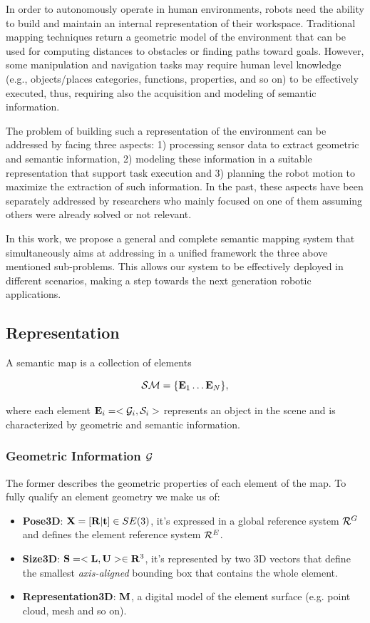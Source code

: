 \documentclass[conference]{IEEEtran}
\begin{document}
In order to autonomously operate in human environments, robots need
the ability to build and maintain an internal representation of their
workspace. Traditional mapping techniques return a geometric model of
the environment that can be used for computing distances to obstacles
or finding paths toward goals. However, some manipulation and
navigation tasks may require human level knowledge (e.g.,
objects/places categories, functions, properties, and so on) to be
effectively executed, thus, requiring also the acquisition and
modeling of semantic information.

The problem of building such a representation of the environment can
be addressed by facing three aspects: 1) processing sensor data to
extract geometric and semantic information, 2) modeling these
information in a suitable representation that support task execution
and 3) planning the robot motion to maximize the extraction of such
information. In the past, these aspects have been separately addressed
by researchers who mainly focused on one of them assuming others were
already solved or not relevant.

In this work, we propose a general and complete semantic mapping
system that simultaneously aims at addressing in a unified framework
the three above mentioned sub-problems. This allows our system to be
effectively deployed in different scenarios, making a step towards the
next generation robotic applications.

\subsection{Representation}

A semantic map is a collection of elements

\begin{equation}
\mathcal{SM} = \{ \mathbf{E}_1 \dots \mathbf{E}_N \},
\end{equation}

where each element $\mathbf{E}_i = < \mathcal{G}_i, \mathcal{S}_i>$ represents an object in
the scene and is characterized by geometric and semantic information.

\subsubsection{Geometric Information $\mathcal{G}$}

The former describes the geometric properties of each element of the
map. To fully qualify an element geometry we make us of:
\begin{itemize}
	\item {\bf Pose3D}: $\mathbf{X} = [ \mathbf{R} | \mathbf{t}] \in SE(3)$, it's expressed
    in a global reference system $\mathcal{R}^G$ and defines the element
    reference system $\mathcal{R}^E$.
	\item {\bf Size3D}: $\mathbf{S} = <\mathbf{L} ,\mathbf{U}> \in \mathbf{R}^3 $, it's
    represented by two 3D vectors that define the smallest
    \emph{axis-aligned} bounding box that contains the whole element.
	\item {\bf Representation3D}: $\mathbf{M}$, a digital model of the element
    surface (e.g. point cloud, mesh and so on).
\end{itemize}
\end{document}
